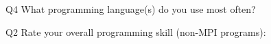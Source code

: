 \begin{description}%
\item{Q4} What programming language(s) do you use most often?%
\item{Q2} Rate your overall programming skill (non-MPI programs):%
\end{description}%
